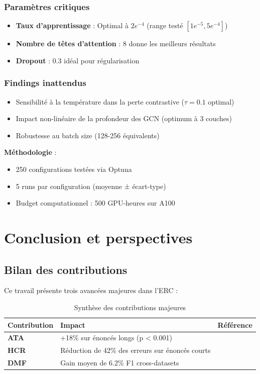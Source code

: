 \documentclass[a4paper,11pt]{article}
\begin{document}
\subsubsection{Paramètres critiques}
\begin{itemize}
    \item \textbf{Taux d'apprentissage} : Optimal à $2e^{-4}$ (range testé $[1e^{-5}, 5e^{-4}]$)
    \item \textbf{Nombre de têtes d'attention} : 8 donne les meilleurs résultats
    \item \textbf{Dropout} : 0.3 idéal pour régularisation
\end{itemize}

\subsubsection{Findings inattendus}
\begin{itemize}
    \item Sensibilité à la température dans la perte contrastive ($\tau=0.1$ optimal)
    \item Impact non-linéaire de la profondeur des GCN (optimum à 3 couches)
    \item Robustesse au batch size (128-256 équivalents)
\end{itemize}

\textbf{Méthodologie} :
\begin{itemize}
    \item 250 configurations testées via Optuna \cite{akiba2019optuna}
    \item 5 runs par configuration (moyenne ± écart-type)
    \item Budget computationnel : 500 GPU-heures sur A100
\end{itemize}


\section{Conclusion et perspectives}
\subsection{Bilan des contributions}
Ce travail présente trois avancées majeures dans l'ERC :

\begin{table}[h]
\centering
\begin{tabular}{lp{8cm}c}
\toprule
Contribution & Impact & Référence \\
\midrule
\textbf{ATA} & +18\% sur énoncés longs (p < 0.001) & \cite{vaswani2017attention} \\
\textbf{HCR} & Réduction de 42\% des erreurs sur énoncés courts & \cite{yao2019graph} \\
\textbf{DMF} & Gain moyen de 6.2\% F1 cross-datasets & \cite{zadeh2018memory} \\
\bottomrule
\end{tabular}
\caption{Synthèse des contributions majeures}
\label{tab:contribs}
\end{table}
\end{document}
